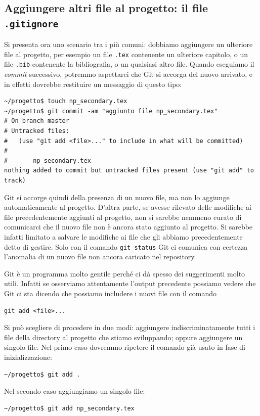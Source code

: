 \documentclass[a4paper,12pt,oneside]{article}
\begin{document}
\subsection{Aggiungere altri file al progetto: il file \lstinline|.gitignore|}
Si presenta ora uno scenario tra i più comuni: dobbiamo aggiungere un ulteriore
file al progetto, per esempio un file \lstinline|.tex| contenente un ulteriore
capitolo, o un file \lstinline|.bib| contenente la bibliografia, o un qualsiasi
altro file. Quando eseguiamo il \emph{commit} successivo, potremmo aspettarci
che Git si accorga del nuovo arrivato, e in effetti dovrebbe restituire un
messaggio di questo tipo:
\begin{lstlisting}
~/progetto$ touch np_secondary.tex
~/progetto$ git commit -am "aggiunto file np_secondary.tex"
# On branch master
# Untracked files:
#   (use "git add <file>..." to include in what will be committed)
#
#       np_secondary.tex
nothing added to commit but untracked files present (use "git add" to track)
\end{lstlisting}
Git si accorge quindi della presenza di un nuovo file, ma non lo aggiunge
automaticamente al progetto. D'altra parte, se avesse rilevato delle modifiche
ai file precedentemente aggiunti al progetto, non si sarebbe nemmeno curato di
comunicarci che il nuovo file non è ancora stato aggiunto al progetto. Si
sarebbe infatti limitato a salvare le modifiche ai file che gli abbiamo
precedentemente detto di gestire. Solo con il comando \lstinline|git status|
Git ci comunica con certezza l'anomalia di un nuovo file non ancora caricato nel
repository.

Git è un programma molto gentile perché ci dà spesso dei suggerimenti molto utili.
Infatti se osserviamo attentamente l'output precedente possiamo vedere che Git
ci sta dicendo che possiamo includere i nuovi file con il comando
\begin{lstlisting}
git add <file>...
\end{lstlisting}
Si può scegliere di procedere in due modi:
aggiungere indiscriminatamente tutti i file della directory al progetto che
stiamo sviluppando; oppure aggiungere un singolo file. Nel primo caso dovremmo
ripetere il comando già usato in fase di inizializzazione:
\begin{lstlisting}
~/progetto$ git add .
\end{lstlisting}
Nel secondo caso aggiungiamo un singolo file:
\begin{lstlisting}
~/progetto$ git add np_secondary.tex
\end{lstlisting}
\end{document}
